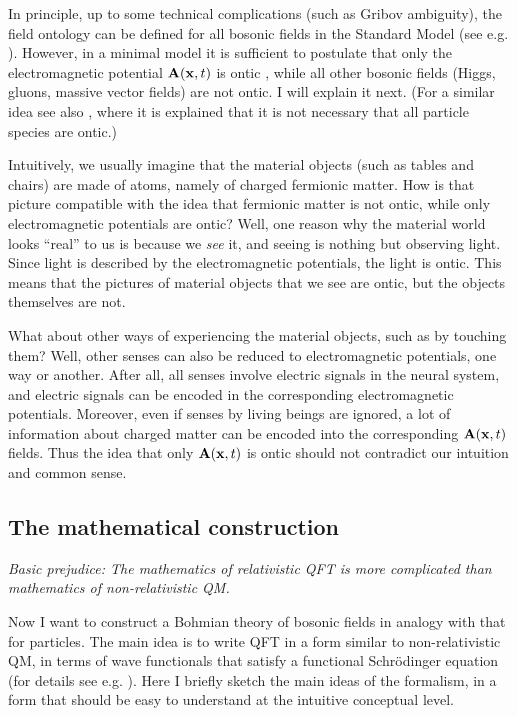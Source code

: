 \documentclass[12pt]{article}
\begin{document}
In principle, up to some technical complications (such as Gribov ambiguity), 
the field ontology can be defined for all bosonic fields in the Standard Model
(see e.g. \cite{struyve}). However, in a minimal model it is sufficient
to postulate that only the electromagnetic potential ${\bf A}({\bf x},t)$ is ontic \cite{struyve-westman}, 
while all other bosonic fields (Higgs, gluons, massive vector fields) are not ontic. 
I will explain it next.
%
(For a similar idea see also \cite{not_all}, where it is explained that it is not necessary that all 
particle species are ontic.)


Intuitively, we usually imagine that the material objects (such as tables and chairs) are made of atoms, 
namely of charged fermionic matter. How is that picture compatible with the idea that
fermionic matter is not ontic, while only electromagnetic potentials are ontic? 
Well, one reason why the material world looks ``real'' to us is because 
we {\em see} it, and seeing is nothing but observing light.
Since light is described by the electromagnetic potentials, the light is ontic.
This means that the pictures of material objects that we see are ontic, but the objects themselves are not.

What about other ways of experiencing the material objects, such as by touching them? 
Well, other senses can also be reduced to electromagnetic potentials, one way or another.
After all, all senses involve electric signals in the neural system, and electric signals 
can be encoded in the corresponding electromagnetic potentials.
Moreover, even if senses by living beings are ignored, a lot of information about charged matter 
can be encoded into the corresponding ${\bf A}({\bf x},t)$ fields. Thus the idea that
only ${\bf A}({\bf x},t)$ is ontic should not contradict our intuition and common sense.   


\subsection{The mathematical construction}

\begin{flushright}
{\it Basic prejudice: The mathematics of relativistic QFT is more complicated than mathematics of non-relativistic QM.} 
\end{flushright}

Now I want to construct a Bohmian theory of bosonic fields in analogy with that for particles. 
The main idea is to write QFT in a form similar to non-relativistic QM,
in terms of wave functionals that satisfy a functional Schr\"odinger equation
(for details see e.g. \cite{hatfield}).
Here I briefly sketch the main ideas of the formalism, in a form that should be easy to understand 
at the intuitive conceptual level.
\end{document}
